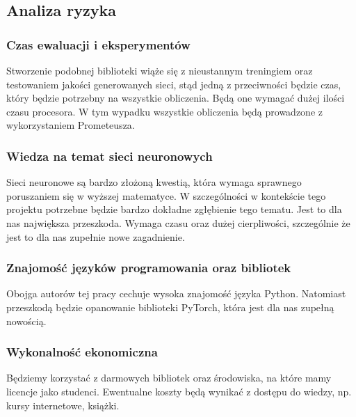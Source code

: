 \subsection{Analiza ryzyka}

\subsubsection{Czas ewaluacji i eksperymentów}
Stworzenie podobnej biblioteki wiąże się z nieustannym treningiem oraz testowaniem jakości 
generowanych sieci, stąd jedną z przeciwności będzie czas, który będzie potrzebny na wszystkie 
obliczenia. Będą one wymagać dużej ilości czasu procesora. W tym wypadku wszystkie obliczenia 
będą prowadzone z wykorzystaniem Prometeusza.


\subsubsection{Wiedza na temat sieci neuronowych}
Sieci neuronowe są bardzo złożoną kwestią, która wymaga sprawnego poruszaniem się w wyższej 
matematyce. W szczególności w kontekście tego projektu potrzebne będzie bardzo dokładne zgłębienie 
tego tematu. Jest to dla nas największa przeszkoda. Wymaga czasu oraz dużej cierpliwości, 
szczególnie że jest to dla nas zupełnie nowe zagadnienie.


\subsubsection{Znajomość języków programowania oraz bibliotek }
Obojga autorów tej pracy cechuje wysoka znajomość języka Python. Natomiast przeszkodą będzie 
opanowanie biblioteki PyTorch, która jest dla nas zupełną nowością.



\subsubsection{Wykonalność ekonomiczna }
Będziemy korzystać z darmowych bibliotek oraz środowiska, na które mamy licencje jako studenci. 
Ewentualne koszty będą wynikać z dostępu do wiedzy, np. kursy internetowe, książki.